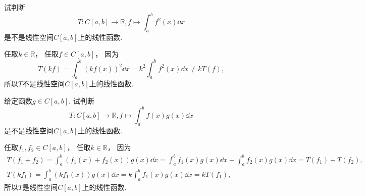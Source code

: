 \begin{example}
试判断\begin{equation*}
	T\colon C[a,b] \to \mathbb{R},
	f \mapsto \int_a^b f^2(x) \dd{x}
\end{equation*}
是不是线性空间\(C[a,b]\)上的线性函数.
\begin{solution}
任取\(k\in\mathbb{R}\)，
任取\(f\in C[a,b]\)，
因为\begin{equation*}
	T(k f)
	= \int_a^b (k f(x))^2 \dd{x}
	= k^2 \int_a^b f^2(x) \dd{x}
	\neq k T(f),
\end{equation*}
所以\(T\)不是线性空间\(C[a,b]\)上的线性函数.
\end{solution}
\end{example}
\begin{example}
给定函数\(g \in C[a,b]\).
试判断\begin{equation*}
	T\colon C[a,b] \to \mathbb{R},
	f \mapsto \int_a^b f(x) g(x) \dd{x}
\end{equation*}
是不是线性空间\(C[a,b]\)上的线性函数.
\begin{solution}
任取\(f_1,f_2\in C[a,b]\)，
任取\(k\in\mathbb{R}\)，
因为\begin{gather*}
	T(f_1+f_2)
	= \int_a^b (f_1(x)+f_2(x)) g(x) \dd{x}
	= \int_a^b f_1(x) g(x) \dd{x} + \int_a^b f_2(x) g(x) \dd{x}
	= T(f_1) + T(f_2), \\
	T(k f_1)
	= \int_a^b (k f_1(x)) g(x) \dd{x}
	= k \int_a^b f_1(x) g(x) \dd{x}
	= k T(f_1),
\end{gather*}
所以\(T\)是线性空间\(C[a,b]\)上的线性函数.
\end{solution}
\end{example}

